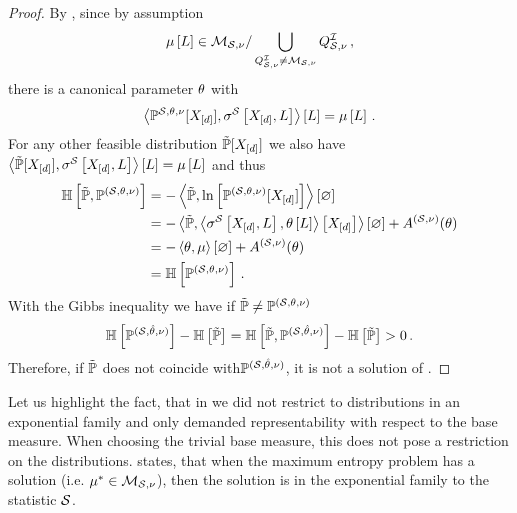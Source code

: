 \begin{proof}
    By , since by assumption
    \begin{align*}
        \mu\left[L\right] \in \mathcal{M}_{\mathcal{S},\nu} / \bigcup_{Q^{\mathcal{I}}_{\mathcal{S},\nu}\neq\mathcal{M}_{\mathcal{S},\nu}} Q^{\mathcal{I}}_{\mathcal{S},\nu} \, ,
    \end{align*}
    there is a canonical parameter $\theta$ with
    \begin{align*}
        \left\langle \mathbb{P}^{\mathcal{S},\theta,\nu}[X_{[d]}],\sigma^{\mathcal{S}}\left[X_{[d]},L\right]\right\rangle \left[ L \right]=\mu\left[L\right] \, .
    \end{align*}
    For any other feasible distribution $\tilde{\mathbb{P}}[X_{[d]}]$ we also have $\left\langle \tilde{\mathbb{P}}[X_{[d]}],\sigma^{\mathcal{S}}\left[X_{[d]},L\right]\right\rangle \left[ L \right]=\mu\left[L\right]$ and thus
    \begin{align*}
        \mathbb{H}\left[\tilde{\mathbb{P}},\mathbb{P}^{(\mathcal{S},\theta,\nu)}\right]
        &= -\left\langle \tilde{\mathbb{P}},\ln \left[ \mathbb{P}^{(\mathcal{S},\theta,\nu)}[X_{[d]}] \right]\right\rangle \left[ \varnothing \right] \\
        &= -\left\langle \tilde{\mathbb{P}},\left\langle \sigma^{\mathcal{S}}\left[X_{[d]},L\right],\theta\left[L\right]\right\rangle \left[ X_{[d]} \right]\right\rangle \left[ \varnothing \right] + A^{(\mathcal{S},\nu)}(\theta) \\
        &= - \left\langle \theta,\mu\right\rangle \left[ \varnothing \right] + A^{(\mathcal{S},\nu)}(\theta) \\
        &= \mathbb{H}\left[\mathbb{P}^{(\mathcal{S},\theta,\nu)}\right] \, .
    \end{align*}
    With the Gibbs inequality we have if $\tilde{\mathbb{P}}\neq\mathbb{P}^{(\mathcal{S},\theta,\nu)}$
    \begin{align*}
        \mathbb{H}\left[\mathbb{P}^{(\mathcal{S},\hat{\theta},\nu)}\right] - \mathbb{H}\left[\tilde{\mathbb{P}}\right]
        = \mathbb{H}\left[\tilde{\mathbb{P}},\mathbb{P}^{(\mathcal{S},\hat{\theta},\nu)}\right] - \mathbb{H}\left[\tilde{\mathbb{P}}\right] > 0 \, .
    \end{align*}
    Therefore, if $\tilde{\mathbb{P}}$ does not coincide with$\mathbb{P}^{(\mathcal{S},\hat{\theta},\nu)}$, it is not a solution of .
\end{proof}

Let us highlight the fact, that in  we did not restrict to distributions in an exponential family and only demanded representability with respect to the base measure.
When choosing the trivial base measure, this does not pose a restriction on the distributions.
 states, that when the maximum entropy problem has a solution (i.e. $\mu^*\in\mathcal{M}_{\mathcal{S},\nu}$), then the solution is in the exponential family to the statistic $\mathcal{S}$.

